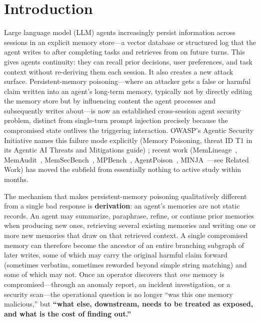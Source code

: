 \section{Introduction}

Large language model (LLM) agents increasingly persist information
across sessions in an explicit memory store---a vector database or
structured log that the agent writes to after completing tasks and
retrieves from on future turns. This gives agents continuity: they can
recall prior decisions, user preferences, and task context without
re-deriving them each session. It also creates a new attack surface.
Persistent-memory poisoning---where an attacker gets a false or harmful
claim written into an agent's long-term memory, typically not by
directly editing the memory store but by influencing content the agent
processes and subsequently writes about---is now an established
cross-session agent security problem, distinct from single-turn prompt
injection precisely because the compromised state outlives the
triggering interaction. OWASP's Agentic Security Initiative names this
failure mode explicitly (Memory Poisoning, threat ID T1 in its
Agentic AI Threats and Mitigations guide) \cite{owasp-asi}; recent work
(MemLineage~\cite{memlineage}, MemAudit~\cite{memaudit},
MemSecBench~\cite{memsecbench}, MPBench~\cite{mpbench},
AgentPoison~\cite{agentpoison}, MINJA~\cite{minja}---see Related Work)
has moved the subfield from essentially nothing to active study within
months.

The mechanism that makes persistent-memory poisoning qualitatively
different from a single bad response is \textbf{derivation}: an agent's
memories are not static records. An agent may summarize, paraphrase,
refine, or continue prior memories when producing new ones, retrieving
several existing memories and writing one or more new memories that
draw on that retrieved context. A single compromised memory can
therefore become the ancestor of an entire branching subgraph of later
writes, some of which may carry the original harmful claim forward
(sometimes verbatim, sometimes reworded beyond simple string matching)
and some of which may not. Once an operator discovers that \emph{one}
memory is compromised---through an anomaly report, an incident
investigation, or a security scan---the operational question is no
longer ``was this one memory malicious,'' but \textbf{``what else,
downstream, needs to be treated as exposed, and what is the cost of
finding out.''}


